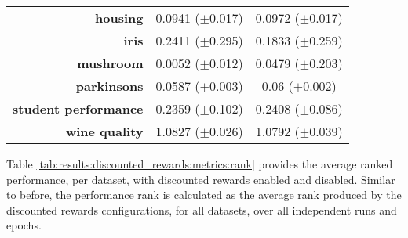 \begin{table}[htb]
{\begin{tabular}{r|cc}
                  \textbf{housing}             & \cellcolor[rgb]{ .388,  .745,  .482}0.0941 ($\pm$0.017)             & \cellcolor[rgb]{ .973,  .412,  .42}0.0972 ($\pm$0.017)  \\
                  \textbf{iris}                & \cellcolor[rgb]{ .973,  .412,  .42}0.2411 ($\pm$0.295)              & \cellcolor[rgb]{ .388,  .745,  .482}0.1833 ($\pm$0.259) \\
                  \textbf{mushroom}            & \cellcolor[rgb]{ .388,  .745,  .482}0.0052 ($\pm$0.012)             & \cellcolor[rgb]{ .973,  .412,  .42}0.0479 ($\pm$0.203)  \\
                  \textbf{parkinsons}          & \cellcolor[rgb]{ .388,  .745,  .482}0.0587 ($\pm$0.003)             & \cellcolor[rgb]{ .973,  .412,  .42}0.06 ($\pm$0.002)    \\
                  \textbf{student performance} & \cellcolor[rgb]{ .388,  .745,  .482}0.2359 ($\pm$0.102)             & \cellcolor[rgb]{ .973,  .412,  .42}0.2408 ($\pm$0.086)  \\
                  \textbf{wine quality}        & \cellcolor[rgb]{ .973,  .412,  .42}1.0827 ($\pm$0.026)              & \cellcolor[rgb]{ .388,  .745,  .482}1.0792 ($\pm$0.039) \\
            \end{tabular}%
      }
\end{table}%

Table \ref{tab:results:discounted_rewards:metrics:rank} provides the average ranked performance, per dataset, with discounted rewards enabled and disabled. Similar to before, the performance rank is calculated as the average rank produced by the discounted rewards configurations, for all datasets, over all independent runs and epochs.

